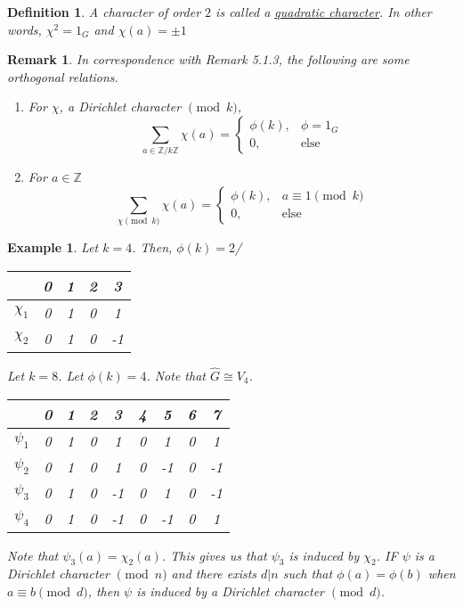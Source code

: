 \documentclass{article}
\newcommand{\Z}{\mathbb{Z}}
\newtheorem{remark}{Remark}[subsection]
\newtheorem{example}{Example}[subsection]
\newtheorem{definition}{Definition}[subsection]
\begin{document}
\begin{definition}
A character of order $2$ is called a \underline{quadratic character}. In other words, $\chi^2=1_G$ and $\chi(a)=\pm 1$
\end{definition}
\begin{remark}
In correspondence with Remark 5.1.3, the following are some orthogonal relations.
\begin{enumerate}
    \item For $\chi$, a Dirichlet character $\pmod{k}$,
    \begin{equation*}
        \sum_{a\in\Z/k\Z}\chi(a)=
        \begin{cases}
        \phi(k), &\phi=1_G\\
        0, &\text{else}
        \end{cases}
    \end{equation*}
        \item For $a\in \Z$
    \begin{equation*}
        \sum_{\chi\pmod{k}}\chi(a)=
        \begin{cases}
        \phi(k), &a\equiv 1\pmod{k}\\
        0, &\text{else}
        \end{cases}
    \end{equation*}
\end{enumerate}
\end{remark}
\newpage
\begin{example}
Let $k=4$. Then, $\phi(k)=2$/
\begin{table}[H]
    \centering
    \begin{tabular}{c|cccc}
         &  0 & 1 & 2 & 3\\\hline
        $\chi_1$ & 0 & 1 & 0 & 1\\
        $\chi_2$ & 0 & 1 & 0 & -1
    \end{tabular}
\end{table}
Let $k=8$. Let $\phi(k)=4$. Note that $\widehat{G}\cong V_4$.
\begin{table}[H]
    \centering
    \begin{tabular}{c|cccccccc}
         & 0 & 1 & 2 & 3 & 4 & 5 & 6 & 7 \\\hline
        $\psi_1$ & 0 & 1 & 0 & 1 & 0 & 1 & 0 & 1\\
        $\psi_2$ & 0 & 1 & 0 & 1 & 0 & -1 & 0 & -1\\
        $\psi_3$ & 0 & 1 & 0 & -1 & 0 & 1 & 0 & -1\\
        $\psi_4$ & 0 & 1 & 0 & -1 & 0 & -1& 0 & 1
    \end{tabular}
\end{table}
Note that $\psi_3(a)=\chi_2(a)$. This gives us that $\psi_3$ is induced by $\chi_2$. IF $\psi$ is a Dirichlet character $\pmod{n}$ and there exists $d|n$ such that $\phi(a)=\phi(b)$ when $a\equiv b\pmod{d}$, then $\psi$ is induced by a Dirichlet character $\pmod{d}$.
\end{example}
\end{document}
